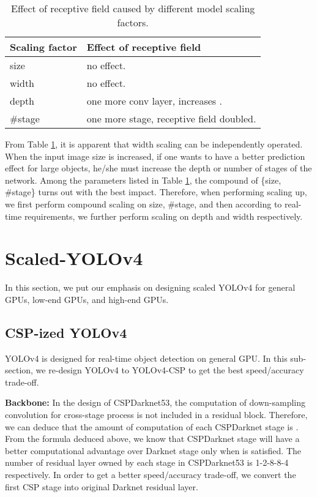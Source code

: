 \documentclass[10pt,twocolumn,letterpaper]{article}
\begin{document}
\begin{table}[h]
	\centering
	\begin{threeparttable}[h]
		\footnotesize
		\caption{Effect of receptive field caused by different model scaling factors.}
		\label{table:t8}
		\setlength\tabcolsep{3.5pt}
		\begin{tabular}{ll}
			\toprule
			\textbf{Scaling factor} & \textbf{Effect of receptive field} \\				
			\midrule
			size & no effect. \\
			width & no effect. \\
			depth & one more  conv layer, increases . \\
			\#stage & one more stage, receptive field doubled. \\
			\bottomrule
		\end{tabular}
	\end{threeparttable}
\end{table}

From Table \ref{table:t8}, it is apparent that width scaling can be independently operated.  When the input image size is increased, if one wants to have a better prediction effect for large objects, he/she must increase the depth or number of stages of the network.  Among the parameters listed in Table \ref{table:t8}, the compound of \{size, \#stage\} turns out with the best impact.  Therefore, when performing scaling up, we first perform compound scaling on {size, \#stage}, and then according to real-time requirements, we further perform scaling on depth and width respectively.

\section{Scaled-YOLOv4}

In this section, we put our emphasis on designing scaled YOLOv4 for general GPUs, low-end GPUs, and high-end GPUs.

\subsection{CSP-ized YOLOv4}

YOLOv4 is designed for real-time object detection on general GPU.  In this sub-section, we re-design YOLOv4 to YOLOv4-CSP to get the best speed/accuracy trade-off.

\noindent
\textbf{Backbone:} In the design of CSPDarknet53, the computation of down-sampling convolution for cross-stage process is not included in a residual block.  Therefore, we can deduce that the amount of computation of each CSPDarknet stage is .  From the formula deduced above, we know that CSPDarknet stage will have a better computational advantage over Darknet stage only when  is satisfied.  The number of residual layer owned by each stage in CSPDarknet53 is 1-2-8-8-4 respectively.  In order to get a better speed/accuracy trade-off, we convert the first CSP stage into original Darknet residual layer.
\end{document}
